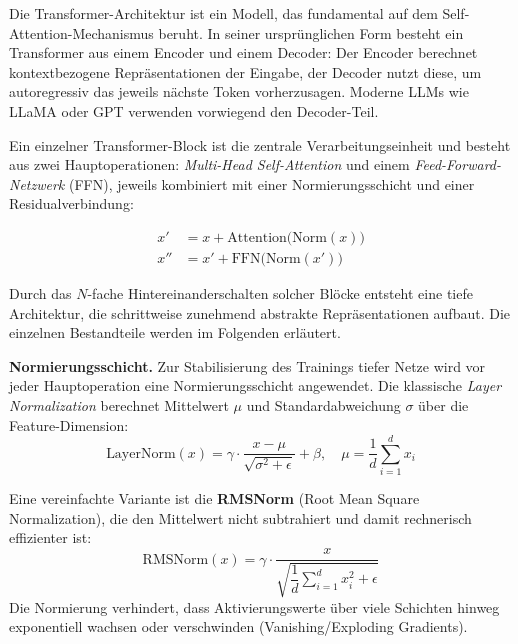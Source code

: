 Die Transformer-Architektur ist ein Modell, das fundamental auf dem Self-Attention-Mechanismus beruht. In seiner ursprünglichen Form besteht ein Transformer aus einem Encoder und einem Decoder: Der Encoder berechnet kontextbezogene Repräsentationen der Eingabe, der Decoder nutzt diese, um autoregressiv das jeweils nächste Token vorherzusagen. Moderne LLMs wie LLaMA oder GPT verwenden vorwiegend den Decoder-Teil.

Ein einzelner Transformer-Block ist die zentrale Verarbeitungseinheit und besteht aus zwei Hauptoperationen: \textit{Multi-Head Self-Attention} und einem \textit{Feed-Forward-Netzwerk} (FFN), jeweils kombiniert mit einer Normierungsschicht und einer Residualverbindung:

\begin{align}
    x' &= x + \text{Attention}\bigl(\text{Norm}(x)\bigr) \\
    x'' &= x' + \text{FFN}\bigl(\text{Norm}(x')\bigr)
    \label{eq:block}
\end{align}

Durch das $N$-fache Hintereinanderschalten solcher Blöcke entsteht
eine tiefe Architektur, die schrittweise zunehmend abstrakte Repräsentationen
aufbaut. Die einzelnen Bestandteile werden im Folgenden erläutert.

\textbf{Normierungsschicht.}
Zur Stabilisierung des Trainings tiefer Netze wird vor jeder
Hauptoperation eine Normierungsschicht angewendet.
Die klassische \emph{Layer Normalization} berechnet Mittelwert $\mu$
und Standardabweichung $\sigma$ über die Feature-Dimension:
\begin{equation}
    \text{LayerNorm}(x) = \gamma \cdot \frac{x - \mu}{\sqrt{\sigma^2 + \epsilon}} + \beta,
    \quad \mu = \frac{1}{d}\sum_{i=1}^d x_i
    \label{eq:layernorm}
\end{equation}

Eine vereinfachte Variante ist die \textbf{RMSNorm}
(Root Mean Square Normalization), die den Mittelwert nicht subtrahiert
und damit rechnerisch effizienter ist:
\begin{equation}
    \text{RMSNorm}(x) = \gamma \cdot \frac{x}{\sqrt{\dfrac{1}{d}\sum_{i=1}^{d} x_i^2 + \epsilon}}
    \label{eq:rmsnorm}
\end{equation}
Die Normierung verhindert, dass Aktivierungswerte über viele Schichten
hinweg exponentiell wachsen oder verschwinden (Vanishing/Exploding Gradients).

